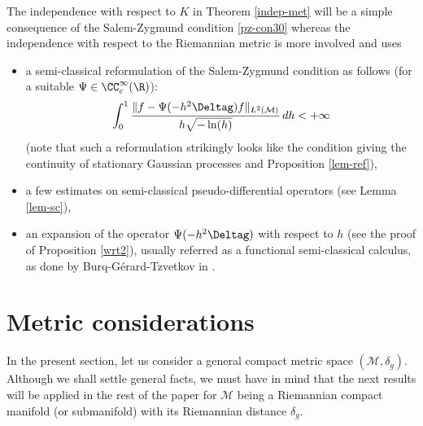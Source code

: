 The independence with respect to $K$ in Theorem \ref{indep-met} will be a simple consequence of the Salem-Zygmund condition \eqref{pz-con30} whereas the independence with respect to the Riemannian metric is more involved and uses
\begin{itemize}
\item a semi-classical reformulation of the Salem-Zygmund condition as follows (for a suitable $\Psi\in \CC_c^\infty(\R)$):
\begin{equation*}
\int_{0}^{1} \frac{\|f-\Psi(-h^2 \Deltag)f\|_{L^2(\mathcal{M})}}{h\sqrt{-\ln(h)}}\, dh <+\infty
\end{equation*}
(note that such a reformulation strikingly looks like the condition giving the continuity of stationary Gaussian processes \cite{marcus-shepp,marcus1973} and Proposition \ref{lem-ref}),
\item a few estimates on semi-classical pseudo-differential operators (see Lemma \ref{lem-sc}),
\item an expansion of the operator $\Psi(-h^2 \Deltag)$ with respect to $h$ (see the proof of Proposition \ref{wrt2}), usually referred as a functional semi-classical calculus, as done by Burq-Gérard-Tzvetkov in \cite{burq2004}.
\end{itemize}

\section{Metric considerations}\label{met-con}

In the present section, let us consider a general compact metric space $(\mathcal{M},\delta_g)$. Although we shall settle general facts, we must have in mind that the next results will be applied in the rest of the paper for $\mathcal{M}$ being a Riemannian compact manifold (or submanifold) with its Riemannian distance $\delta_g$.

